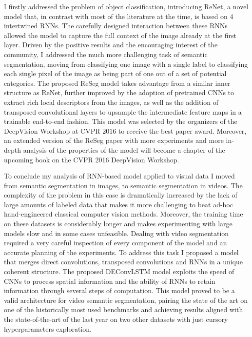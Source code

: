 I firstly addressed the problem of object classification, introducing ReNet, a
novel model that, in contrast with most of the literature at the time, is
based on 4 intertwined RNNs. The carefully designed interaction between these
RNNs allowed the model to capture the full context of the image already at the
first layer. Driven by the positive results and the encouraging interest of
the community, I addressed the much more challenging task of semantic
segmentation, moving from classifying one image with a single label to
classifying each single pixel of the image as being part of one out of a set of
potential categories. The proposed ReSeg model takes advantage from a similar
inner structure as ReNet, further improved by the adoption of pretrained CNNs
to extract rich local descriptors from the images, as well as the addition of
transposed convolutional layers to upsample the intermediate feature maps in a
trainable end-to-end fashion. This model was selected by the organizers of the
DeepVision Workshop at CVPR 2016 to receive the best paper award. Moreover, an
extended version of the ReSeg paper with more experiments and more in-depth
analysis of the properties of the model will become a chapter of the upcoming
book on the CVPR 2016 DeepVision Workshop.

To conclude my analysis of RNN-based model applied to visual data I moved from
semantic segmentation in images, to semantic segmentation in videos. The
complexity of the problem in this case is dramatically increased by the lack of
large amounts of labeled data that makes it more challenging to beat ad-hoc
hand-engineered classical computer vision methods. Moreover, the training time
on these datasets is considerably longer and makes experimenting with large
models slow and in some cases unfeasible. Dealing with video segmentation
required a very careful inspection of every component of the model and an
accurate planning of the experiments. To address this task I proposed a model
that merges direct convolutions, transposed convolutions and RNNs in a unique
coherent structure. The proposed DEConvLSTM model exploits the speed of CNNs to
process spatial information and the ability of RNNs to retain information
through several steps of computation. This model proved to be a valid
architecture for video semantic segmentation, pairing the state of the art on
one of the historically most used benchmarks and achieving results
aligned with the state-of-the-art of the last year on two other datasets with
just cursory hyperparameters exploration.

